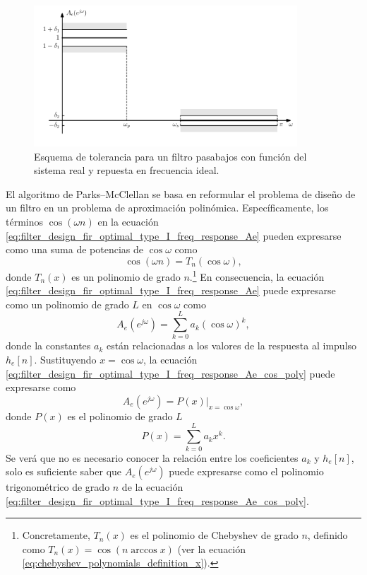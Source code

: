 \documentclass[a4paper]{report}
\begin{document}
\begin{figure}[!htb]
 \begin{center}
 \includegraphics[width=0.88\textwidth]{figuras/filter_design_fir_optimal_specifications.pdf}
 \caption{\label{fig:filter_design_fir_optimal_specifications} Esquema de tolerancia para un filtro pasabajos con función del sistema real y repuesta en frecuencia ideal.}
 \end{center}
\end{figure}

El algoritmo de Parks--McClellan se basa en reformular el problema de diseño de un filtro en un problema de aproximación polinómica. Específicamente, los términos \(\cos(\omega n)\) en la ecuación \ref{eq:filter_design_fir_optimal_type_I_freq_response_Ae} pueden expresarse como una suma de potencias de \(\cos\omega\) como
\[
 \cos(\omega n)=T_n(\cos\omega),
\]
donde \(T_n(x)\) es un polinomio de grado \(n\).\footnote{Concretamente, \(T_n(x)\) es el polinomio de Chebyshev de grado \(n\), definido como \(T_n(x)=\cos(n\arccos x)\) (ver la ecuación \ref{eq:chebyshev_polynomials_definition_x}).} En consecuencia, la ecuación \ref{eq:filter_design_fir_optimal_type_I_freq_response_Ae} puede expresarse como un polinomio de grado \(L\) en \(\cos\omega\) como 
\begin{equation}\label{eq:filter_design_fir_optimal_type_I_freq_response_Ae_cos_poly}
 A_e(e^{j\omega})=\sum_{k=0}^L a_k(\cos\omega)^k, 
\end{equation}
donde la constantes \(a_k\) están relacionadas a los valores de la respuesta al impulso \(h_e[n]\). Sustituyendo \(x=\cos\omega\), la ecuación \ref{eq:filter_design_fir_optimal_type_I_freq_response_Ae_cos_poly} puede expresarse como
\[
 A_e(e^{j\omega})=P(x)\big|_{x=\cos\omega},
\]
donde \(P(x)\) es el polinomio de grado \(L\)
\[
 P(x)=\sum_{k=0}^L a_kx^k.
\]
Se verá que no es necesario conocer la relación entre los coeficientes \(a_k\) y \(h_e[n]\), solo es suficiente saber que \(A_e(e^{j\omega})\) puede expresarse como el polinomio trigonométrico de grado \(n\) de la ecuación \ref{eq:filter_design_fir_optimal_type_I_freq_response_Ae_cos_poly}.
\end{document}

